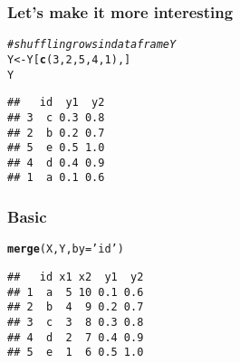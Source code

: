 \documentclass[12pt]{beamer}\usepackage[]{graphicx}\usepackage[]{color}
\makeatletter
\newcommand{\hlnum}[1]{\textcolor[rgb]{0.686,0.059,0.569}{#1}}%
\newcommand{\hlstr}[1]{\textcolor[rgb]{0.192,0.494,0.8}{#1}}%
\newcommand{\hlcom}[1]{\textcolor[rgb]{0.678,0.584,0.686}{\textit{#1}}}%
\newcommand{\hlstd}[1]{\textcolor[rgb]{0.345,0.345,0.345}{#1}}%
\newcommand{\hlkwb}[1]{\textcolor[rgb]{0.69,0.353,0.396}{#1}}%
\newcommand{\hlkwc}[1]{\textcolor[rgb]{0.333,0.667,0.333}{#1}}%
\newcommand{\hlkwd}[1]{\textcolor[rgb]{0.737,0.353,0.396}{\textbf{#1}}}%
\newenvironment{kframe}{%
 \def\at@end@of@kframe{}%
 \ifinner\ifhmode%
  \def\at@end@of@kframe{\end{minipage}}%
  \begin{minipage}{\columnwidth}%
 \fi\fi%
 \def\FrameCommand##1{\hskip\@totalleftmargin \hskip-\fboxsep
 \colorbox{shadecolor}{##1}\hskip-\fboxsep
     \hskip-\linewidth \hskip-\@totalleftmargin \hskip\columnwidth}%
 \MakeFramed {\advance\hsize-\width
   \@totalleftmargin\z@ \linewidth\hsize
   \@setminipage}}%
 {\par\unskip\endMakeFramed%
 \at@end@of@kframe}
\newenvironment{knitrout}{}{} %
\makeatother
\begin{document}

\begin{frame}[fragile]
\frametitle{Let's make it more interesting}

\begin{knitrout}\footnotesize
{}\color{fgcolor}\begin{kframe}
\begin{alltt}
\hlcom{# shuffling rows in data frame Y}
\hlstd{Y} \hlkwb{<-} \hlstd{Y[}\hlkwd{c}\hlstd{(}\hlnum{3}\hlstd{,} \hlnum{2}\hlstd{,} \hlnum{5}\hlstd{,} \hlnum{4}\hlstd{,} \hlnum{1}\hlstd{), ]}
\hlstd{Y}
\end{alltt}
\begin{verbatim}
##   id  y1  y2
## 3  c 0.3 0.8
## 2  b 0.2 0.7
## 5  e 0.5 1.0
## 4  d 0.4 0.9
## 1  a 0.1 0.6
\end{verbatim}
\end{kframe}
\end{knitrout}

\end{frame}


\begin{frame}[fragile]
\frametitle{Basic }

\begin{knitrout}\footnotesize
{}\color{fgcolor}\begin{kframe}
\begin{alltt}
\hlkwd{merge}\hlstd{(X, Y,} \hlkwc{by} \hlstd{=} \hlstr{'id'}\hlstd{)}
\end{alltt}
\begin{verbatim}
##   id x1 x2  y1  y2
## 1  a  5 10 0.1 0.6
## 2  b  4  9 0.2 0.7
## 3  c  3  8 0.3 0.8
## 4  d  2  7 0.4 0.9
## 5  e  1  6 0.5 1.0
\end{verbatim}
\end{kframe}
\end{knitrout}

\end{frame}

\end{document}

